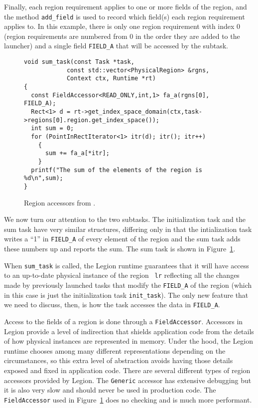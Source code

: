 Finally, each region requirement applies to one or more fields of the region, and the method {\tt add\_field} is
used to record which field(s) each region requirement applies to.
In this example, there is only one region requirement with index 0 (region requirements
are numbered from 0 in the order they are added to the launcher) and a single field {\tt FIELD\_A} that will be
accessed by the subtask.

\begin{figure}
{\small
\begin{lstlisting}
void sum_task(const Task *task,
		    const std::vector<PhysicalRegion> &rgns,
		    Context ctx, Runtime *rt)
{
  const FieldAccessor<READ_ONLY,int,1> fa_a(rgns[0], FIELD_A);
  Rect<1> d = rt->get_index_space_domain(ctx,task->regions[0].region.get_index_space());
  int sum = 0;
  for (PointInRectIterator<1> itr(d); itr(); itr++)
    {
      sum += fa_a[*itr]; 
    }
  printf("The sum of the elements of the region is %d\n",sum);
}
\end{lstlisting}
}
\caption{Region accessors from .}
\label{fig:accessors}
\end{figure}
We now turn our attention to the two subtasks.  The initialization task and the sum task have very similar
structures, differing only in that the intialization task writes a ``1'' in {\tt FIELD\_A} of every element of the region and
the sum task adds these numbers up and reports the sum.  The sum task is shown in Figure~\ref{fig:accessors}.

When {\tt sum\_task} is called, the Legion runtime guarantees that it
will have access to an up-to-date physical instance of the region {\tt
  lr} reflecting all the changes made by previously launched tasks
that modify the {\tt FIELD\_A} of the region (which in this case is
just the initialization task {\tt init\_task}).  The only new feature
that we need to discuss, then, is how the task accesses the data in {\tt FIELD\_A}.

Access to the fields of a region is done through a {\tt FieldAccessor}.  Accessors in Legion provide a level of indirection
that shields application code from the details of how physical instances  are represented in memory.  Under the hood, 
the Legion runtime chooses among many different representations depending on the circumstances, so this extra level
of abstraction avoids having those details exposed and fixed in application code.  There are several different types of
region accessors provided by Legion.  The {\tt Generic} accessor has 
extensive debugging but  it is also very slow and should never be used in production code.  
The {\tt FieldAccessor} used in Figure~\ref{fig:accessors} does no checking and is much more performant.

